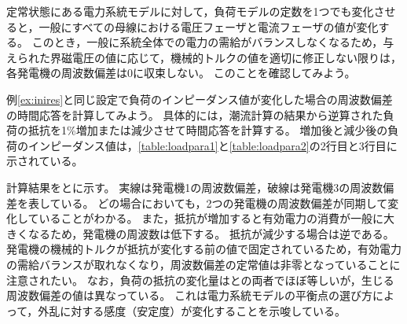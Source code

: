 \documentclass[tombow,dvipdfmx]{corona-a5-1.1}
\begin{document}
定常状態にある電力系統モデルに対して，負荷モデルの定数を1つでも変化させると，一般にすべての母線における電圧フェーザと電流フェーザの値が変化する。
このとき，一般に系統全体での電力の需給がバランスしなくなるため，与えられた界磁電圧の値に応じて，機械的トルクの値を適切に修正しない限りは，各発電機の周波数偏差は0に収束しない。
このことを確認してみよう。

\begin{例}[負荷のインピーダンス変化に対する電力系統モデルの時間応答]\label{ex:loadpv}
例\ref{ex:inires}と同じ設定で負荷のインピーダンス値が変化した場合の周波数偏差の時間応答を計算してみよう。
具体的には，潮流計算の結果から逆算された負荷の抵抗を1\%増加または減少させて時間応答を計算する。
増加後と減少後の負荷のインピーダンス値は，\ref{table:loadpara1}と\ref{table:loadpara2}の2行目と3行目に示されている。

計算結果をとに示す。
実線は発電機1の周波数偏差，破線は発電機3の周波数偏差を表している。
どの場合においても，2つの発電機の周波数偏差が同期して変化していることがわかる。
また，抵抗が増加すると有効電力の消費が一般に大きくなるため，発電機の周波数は低下する。
抵抗が減少する場合は逆である。
発電機の機械的トルクが抵抗が変化する前の値で固定されているため，有効電力の需給バランスが取れなくなり，周波数偏差の定常値は非零となっていることに注意されたい。
なお，負荷の抵抗の変化量はとの両者でほぼ等しいが，生じる周波数偏差の値は異なっている。
これは電力系統モデルの平衡点の選び方によって，外乱に対する感度（安定度）が変化することを示唆している。
\end{例}
\end{document}
